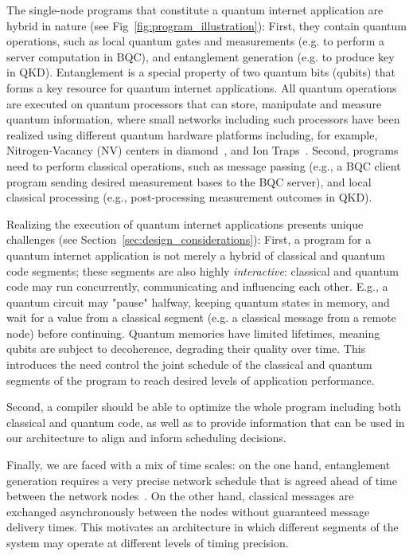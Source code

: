 The single-node programs that constitute a quantum internet application are hybrid in nature (see Fig~\ref{fig:program_illustration}):
First, they contain quantum operations, such as local quantum gates and measurements (e.g. to perform a server computation in BQC), and entanglement generation (e.g. to produce key in QKD). Entanglement is a special property of two quantum bits (qubits) that forms a key resource for quantum internet applications. 
All quantum operations are executed on quantum processors that can store, manipulate and measure quantum information, where small networks including such processors have been realized using different quantum hardware platforms including, for example,  Nitrogen-Vacancy (NV) centers in diamond~\cite{pompili2021realization}, and Ion Traps~\cite{krutyanskiy2023entanglement}.
Second, programs need to perform classical operations, such as message passing (e.g., a BQC client program sending desired measurement bases to the BQC server), and local classical processing (e.g., post-processing measurement outcomes in QKD).

Realizing the execution of quantum internet applications presents unique challenges (see Section~\ref{sec:design_considerations}): 
First, a program for a quantum internet application is not merely a hybrid of classical and quantum code segments; these segments are also highly \textit{interactive}: classical and quantum code may run concurrently, communicating and influencing each other.
E.g., a quantum circuit may "pause" halfway, keeping quantum states in memory, and wait for a value from a classical segment (e.g. a classical message from a remote node) before continuing.
Quantum memories have limited lifetimes, meaning qubits are subject to decoherence, degrading their quality over time. This introduces the need 
control the joint schedule of the classical and quantum segments of the program to reach desired levels of application performance.

Second, a compiler should be able to optimize the whole program including both classical and quantum code, as well as to provide information that can be used in our architecture to align and inform scheduling decisions. 

Finally, we are faced with a mix of time scales:
on the one hand, entanglement generation requires a very precise network schedule that is agreed ahead of time between the network nodes~\cite{dahlberg2019link}. On the other hand, classical messages are exchanged asynchronously between the nodes without guaranteed message delivery times. This motivates an architecture in which different segments of the system may operate at different levels of timing precision. 


